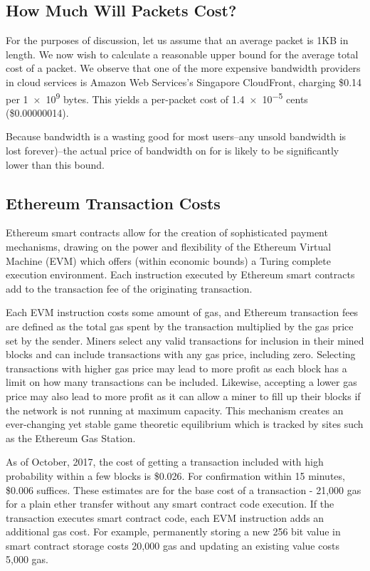 \subsection{How Much Will Packets Cost?}

For the purposes of discussion, let us assume that an average packet is 1KB in length. We now wish to calculate a reasonable upper bound for the average total cost of a packet. We observe that one of the more expensive bandwidth providers in cloud services is Amazon Web Services's Singapore CloudFront, charging \$0.14 per \num{1e9} bytes. This yields a per-packet cost of \num{1.4e-5} cents (\$0.00000014). 

Because bandwidth is a wasting good for most users--any unsold bandwidth is lost forever)--the actual price of bandwidth on for \tOM{} is likely to be significantly lower than this bound.

\subsection{Ethereum Transaction Costs}

Ethereum smart contracts allow for the creation of sophisticated payment mechanisms, drawing on the power and flexibility of the Ethereum Virtual Machine\cite{ETHSpec} (EVM) which offers (within economic bounds) a Turing complete execution environment. Each instruction executed by Ethereum smart contracts add to the transaction fee of the originating transaction.

Each EVM instruction costs some amount of gas, and Ethereum transaction fees are defined as the total gas spent by the transaction multiplied by the gas price set by the sender. Miners select any valid transactions for inclusion in their mined blocks and can include transactions with any gas price, including zero. Selecting transactions with higher gas price may lead to more profit as each block has a limit on how many transactions can be included. Likewise, accepting a lower gas price may also lead to more profit as it can allow a miner to fill up their blocks if the network is not running at maximum capacity. This mechanism creates an ever-changing yet stable game theoretic equilibrium which is tracked by sites such as the Ethereum Gas Station\cite{ETHGas}.

As of October, 2017, the cost of getting a transaction included with high probability within a few blocks is \$0.026. For confirmation within 15 minutes, \$0.006 suffices. These estimates are for the base cost of a transaction - 21,000 gas for a plain ether transfer without any smart contract code execution. If the transaction executes smart contract code, each EVM instruction adds an additional gas cost. For example, permanently storing a new 256 bit value in smart contract storage costs 20,000 gas and updating an existing value costs 5,000 gas.

